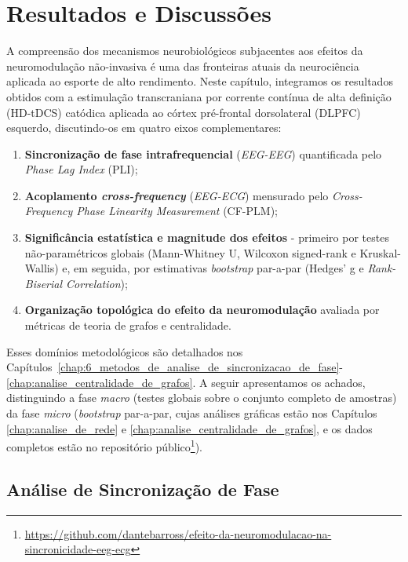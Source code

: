 \chapter{Resultados e Discussões}
\label{chap:resultados_e_discussoes}

A compreensão dos mecanismos neurobiológicos subjacentes aos efeitos da neuromodulação não-invasiva é uma das fronteiras atuais da neurociência aplicada ao esporte de alto rendimento. Neste capítulo, integramos os resultados obtidos com a estimulação transcraniana por corrente contínua de alta definição (HD-tDCS) catódica aplicada ao córtex pré-frontal dorsolateral (DLPFC) esquerdo, discutindo-os em quatro eixos complementares:

\begin{enumerate}
  \item \textbf{Sincronização de fase intrafrequencial} (\emph{EEG-EEG}) quantificada pelo \textit{Phase Lag Index} (PLI);
  \item \textbf{Acoplamento \textit{cross-frequency}} (\emph{EEG-ECG}) mensurado pelo \textit{Cross-Frequency Phase Linearity Measurement} (CF-PLM);
  \item \textbf{Significância estatística e magnitude dos efeitos} - primeiro por testes não-paramétricos globais (Mann-Whitney U, Wilcoxon signed-rank e Kruskal-Wallis) e, em seguida, por estimativas \emph{bootstrap} par-a-par (Hedges' g e \textit{Rank-Biserial Correlation});
  \item \textbf{Organização topológica do efeito da neuromodulação} avaliada por métricas de teoria de grafos e centralidade.
\end{enumerate}

Esses domínios metodológicos são detalhados nos Capítulos~\ref{chap:6_metodos_de_analise_de_sincronizacao_de_fase}-\ref{chap:analise_centralidade_de_grafos}. A seguir apresentamos os achados, distinguindo a fase \emph{macro} (testes globais sobre o conjunto completo de amostras) da fase \emph{micro} (\emph{bootstrap} par-a-par, cujas análises gráficas estão nos Capítulos \ref{chap:analise_de_rede} e \ref{chap:analise_centralidade_de_grafos}, e os dados completos estão no repositório público\footnote{\url{https://github.com/dantebarross/efeito-da-neuromodulacao-na-sincronicidade-eeg-ecg}}).

\section{Análise de Sincronização de Fase}

